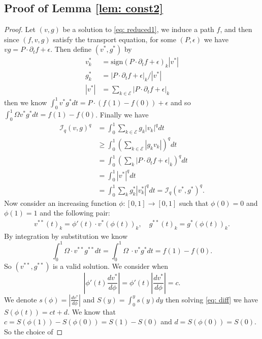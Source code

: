 \documentclass[conference]{IEEEtran}
\newcommand{\EE}{\mathcal{E}}
\theoremstyle{ieeestyle}
\begin{document}
\subsection{Proof of Lemma \ref{lem: const2}}\label{appendix: lem: const2}
\begin{proof}
    Let $(v,g)$ be a solution to \eqref{eq: reduced1}, we induce a path $f$, and then since $(f,v,g)$ satisfy the transport equation, for some $(P,\epsilon)$ we have $vg = P \cdot \partial_t f + \epsilon$. Then define $(v^*,g^*)$ by 
    \begin{align*}
        v^*_k &= \text{sign}(P\cdot \partial_t f + \epsilon)_k|v^*| \\
        g^*_k &= |P \cdot \partial_t f + \epsilon|_k/ |v^*| \\
        |v^*| &= \sum_{k \in \EE} |P \cdot \partial_t f + \epsilon|_k
    \end{align*}
    then we know $\int_0^1 v^*g^* dt = P \cdot (f(1) - f(0)) + \epsilon$ and so $\int_0^1 \Omega v^*g^* dt = f(1) - f(0)$. Finally we have
    \begin{align*}
        \mathcal{I}_q(v,g)^q &= \int_0^1 \sum_{k \in \EE} g_k|v_k|^q dt \\
        &\geq \int_0^1 \left( \sum_{k \in \EE} |g_kv_k|\right)^q dt \\
        &= \int_0^1 \left( \sum_k |P \cdot \partial_t f + \epsilon|_k \right)^q dt \\
        &= \int_0^1 |v^*|^q dt \\
        &= \int_0^1 \sum_k g^*_k |v_k^*|^q dt = \mathcal{I}_q(v^*,g^*)^q.
    \end{align*}
    Now consider an increasing function $\phi: [0,1] \rightarrow [0,1]$ such that $\phi(0) = 0$ and $\phi(1) = 1$ and the following pair:
    \begin{align*}
        v^{**}(t)_k =\phi'(t) \cdot v^{*}(\phi(t))_k, \quad g^{**}(t)_k = g^{*}(\phi(t))_k.
    \end{align*}
    By integration by substitution we know 
    \begin{equation*}
        \int_0^1 \Omega \cdot v^{**}g^{**}dt = \int_0^1 \Omega\ \cdot v^*g^* dt = f(1) - f(0).
    \end{equation*}
    So $(v^{**},g^{**})$ is a valid solution. We consider when 
    \begin{equation}\label{eq: diff}
        \left|\phi'(t) \frac{d v^*}{d\phi} \right| =\phi'(t) \left| \frac{dv^*}{d\phi}\right|= c.
    \end{equation}
    We denote $s(\phi) = \left| \frac{dv^*}{d\phi}\right|$ and $S(y) = \int_0^y s(y) dy$ then solving \eqref{eq: diff} we have $S(\phi(t)) = ct+d$. We know that  $c  = S(\phi(1)) - S(\phi(0))= S(1) - S(0)$ and $d = S(\phi(0))= S(0) $. So the choice of 

\end{proof}
\end{document}
